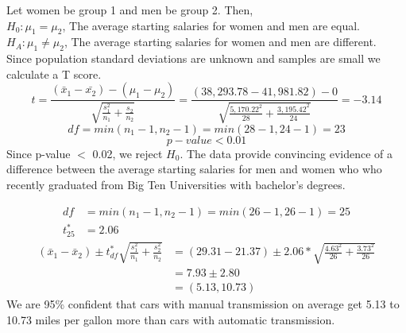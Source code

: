 {
Let women be group 1 and men be group 2. Then, \\
$H_0: \mu_{1} = \mu_{2}$, The average starting salaries for women and men are equal. \\
$H_A: \mu_{1} \ne \mu_{2}$, The average starting salaries for women and men are different. \\
Since population standard deviations are unknown and samples are small we calculate a T score.
\[ t = \frac{(\bar{x}_1 - \bar{x_2}) - (\mu_1 - \mu_2)}{\sqrt{ \frac{s_1^2}{n_1} + \frac{s_2}{n_2} }} = \frac{(38,293.78 - 41,981.82) - 0}{ \sqrt{\frac{5,170.22 ^2}{28} + \frac{3,195.42 ^2}{24}} } = -3.14 \]
\[ df = min(n_1 - 1,  n_2 - 1) = min(28 - 1, 24 - 1) = 23 \]
\[ p-value < 0.01 \]
Since p-value $<$ 0.02, we reject $H_0$. The data provide convincing evidence of a difference between the average starting salaries for men and women who who recently graduated from Big Ten Universities with bachelor's degrees.}\label{menWomenSalaries}

%

{
{
\begin{align*}
df &= min(n_1 - 1,  n_2 - 1) = min(26 - 1, 26 - 1) = 25 \\
t^*_{25} &= 2.06
\end{align*}
\begin{align*}
(\bar{x}_1 - \bar{x}_2) \pm t^*_{df}  \sqrt{\frac{s_1^2}{n_1} + \frac{s_2^2}{n_2}} &= (29.31 - 21.37) \pm 2.06 * \sqrt{\frac{4.63^2}{26} + \frac{3.73^2}{26}} \\
&= 7.93 \pm 2.80 \\
&= (5.13, 10.73)
\end{align*}
We are 95\% confident that cars with manual transmission on average get 5.13 to 10.73 miles per gallon more than cars with automatic transmission.
}}


